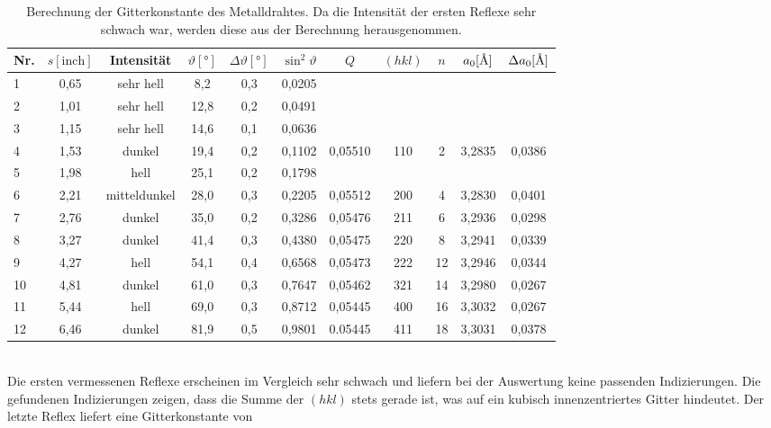 \documentclass[a4paper,twoside,final]{article}
\begin{document}
\begin{table}[ht]
	\centering
	\caption{Berechnung der Gitterkonstante des Metalldrahtes. Da die Intensität der ersten Reflexe sehr schwach war, werden diese aus der Berechnung herausgenommen.}
	\label{tab:Ergebnisse_Metalldraht}
	\begin{tabular}{l c c c c c | c c c c c}
		\toprule
      Nr. & $s [\text{inch}]$ & Intensität & $\vartheta [\si{\degree}]$ & $\Delta \vartheta [\si{\degree}]$ & $\sin^2 \vartheta $ & $Q$ & $(hkl)$ & $n$ & $a_0 [\si{\textup{\AA}}]$ & $\Delta a_0 [\si{\textup{\AA}}]$\\
    \midrule
    1  & 0,65 & sehr hell    & 8,2  & 0,3 & 0,0205 &         &     &    &        &        \\
    2  & 1,01 & sehr hell    & 12,8 & 0,2 & 0,0491 &         &     &    &        &        \\
    3  & 1,15 & sehr hell    & 14,6 & 0,1 & 0,0636 &         &     &    &        &        \\
    4  & 1,53 & dunkel       & 19,4 & 0,2 & 0,1102 & 0,05510 & 110 & 2  & 3,2835 & 0,0386 \\
    5  & 1,98 & hell         & 25,1 & 0,2 & 0,1798 &         &     &    &        &        \\
    6  & 2,21 & mitteldunkel & 28,0 & 0,3 & 0,2205 & 0,05512 & 200 & 4  & 3,2830 & 0,0401 \\
    7  & 2,76 & dunkel       & 35,0 & 0,2 & 0,3286 & 0,05476 & 211 & 6  & 3,2936 & 0,0298 \\
    8  & 3,27 & dunkel       & 41,4 & 0,3 & 0,4380 & 0,05475 & 220 & 8  & 3,2941 & 0,0339 \\
    9  & 4,27 & hell         & 54,1 & 0,4 & 0,6568 & 0,05473 & 222 & 12 & 3,2946 & 0,0344 \\
    10 & 4,81 & dunkel       & 61,0 & 0,3 & 0,7647 & 0,05462 & 321 & 14 & 3,2980 & 0,0267 \\
    11 & 5,44 & hell         & 69,0 & 0,3 & 0,8712 & 0,05445 & 400 & 16 & 3,3032 & 0,0267 \\
    12 & 6,46 & dunkel       & 81,9 & 0,5 & 0,9801 & 0.05445 & 411 & 18 & 3,3031 & 0,0378
	\end{tabular}
\end{table}\\
Die ersten vermessenen Reflexe erscheinen im Vergleich sehr schwach und liefern bei der Auswertung keine passenden Indizierungen. Die gefundenen Indizierungen zeigen, dass die Summe der $(hkl)$ stets gerade ist, was auf ein kubisch innenzentriertes Gitter hindeutet. Der letzte Reflex liefert eine Gitterkonstante von
\end{document}

